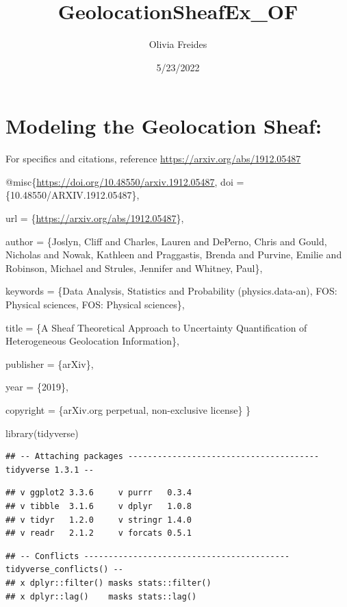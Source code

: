 \documentclass[
]{article}
\title{GeolocationSheafEx\_OF}
\author{Olivia Freides}
\date{5/23/2022}
\newenvironment{Shaded}{\begin{snugshade}}{\end{snugshade}}
\newcommand{\FunctionTok}[1]{\textcolor[rgb]{0.00,0.00,0.00}{#1}}
\newcommand{\NormalTok}[1]{#1}
\begin{document}
\maketitle

\hypertarget{modeling-the-geolocation-sheaf}{%
\section{Modeling the Geolocation
Sheaf:}\label{modeling-the-geolocation-sheaf}}

For specifics and citations, reference
\url{https://arxiv.org/abs/1912.05487}

@misc\{\url{https://doi.org/10.48550/arxiv.1912.05487}, doi =
\{10.48550/ARXIV.1912.05487\},

url = \{\url{https://arxiv.org/abs/1912.05487}\},

author = \{Joslyn, Cliff and Charles, Lauren and DePerno, Chris and
Gould, Nicholas and Nowak, Kathleen and Praggastis, Brenda and Purvine,
Emilie and Robinson, Michael and Strules, Jennifer and Whitney, Paul\},

keywords = \{Data Analysis, Statistics and Probability
(physics.data-an), FOS: Physical sciences, FOS: Physical sciences\},

title = \{A Sheaf Theoretical Approach to Uncertainty Quantification of
Heterogeneous Geolocation Information\},

publisher = \{arXiv\},

year = \{2019\},

copyright = \{arXiv.org perpetual, non-exclusive license\} \}

\begin{Shaded}
\begin{Highlighting}[]
\FunctionTok{library}\NormalTok{(tidyverse)}
\end{Highlighting}
\end{Shaded}

\begin{verbatim}
## -- Attaching packages --------------------------------------- tidyverse 1.3.1 --
\end{verbatim}

\begin{verbatim}
## v ggplot2 3.3.6     v purrr   0.3.4
## v tibble  3.1.6     v dplyr   1.0.8
## v tidyr   1.2.0     v stringr 1.4.0
## v readr   2.1.2     v forcats 0.5.1
\end{verbatim}

\begin{verbatim}
## -- Conflicts ------------------------------------------ tidyverse_conflicts() --
## x dplyr::filter() masks stats::filter()
## x dplyr::lag()    masks stats::lag()
\end{verbatim}
\end{document}
